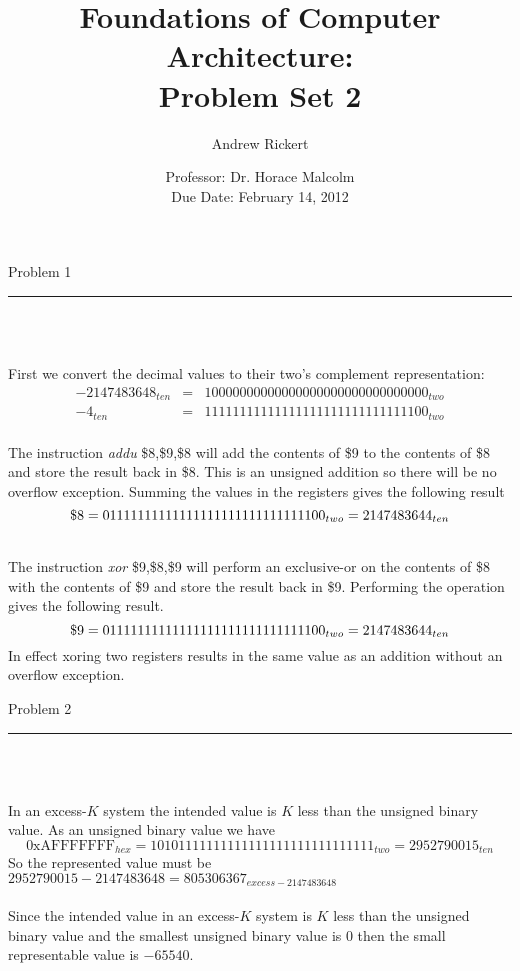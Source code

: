 \documentclass[11pt,reqno]{article}
\title{Foundations of Computer Architecture: \\ Problem Set 2 }
\author{Andrew Rickert}
\date{Professor: Dr. Horace Malcolm \\ \hspace{-19pt} Due Date: February 14,  2012}                                           %
\begin{document}
\maketitle


\begin{flushleft} 
Problem 1 \\
\rule{500pt}{1pt}\\
\end{flushleft} 
\\ 
 First we convert the decimal values to their two's complement representation:
 \begin{eqnarray*}
-2147483648_{ten} &=& 10000000000000000000000000000000_{two} \\
-4_{ten} &=& 11111111111111111111111111111100_{two} \\
\end{eqnarray*}

\noindent The instruction \emph{addu} \$8,\$9,\$8 will add the contents of \$9 to the contents of \$8 and store the result back in \$8. This is an unsigned addition so there will be no overflow exception. Summing the values in the registers gives the following result
\[
\$8 = 01111111111111111111111111111100_{two} = 2147483644_{ten}\\
\]

\noindent{}\\ 
\noindent The instruction \emph{xor} \$9,\$8,\$9 will perform an exclusive-or on the contents of \$8 with the contents of \$9 and store the result back in \$9. Performing the operation gives the following result.
\[
\$9 = 01111111111111111111111111111100_{two} = 2147483644_{ten}\\
\]
In effect xoring two registers results in the same value as an addition without an overflow exception.
\begin{flushleft} 
Problem 2 \\
\rule{500pt}{1pt}\\
\end{flushleft} 
\\ 
In an excess-$K$ system the intended value is $K$ less than the unsigned binary value. As an unsigned binary value we have
\[ \text{0xAFFFFFFF}_{hex} = 10101111111111111111111111111111_{two} = 2952790015_{ten} \]
So the represented value must be $2952790015-2147483648 = 805306367_{excess-2147483648}$\\

\noindent {}\\ 
Since the intended value in an excess-$K$ system is $K$ less than the unsigned binary value and the smallest unsigned binary value is 0 then the small representable value is $-65540$.\\
\end{document}
